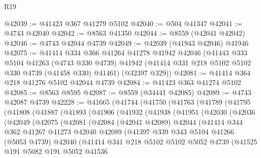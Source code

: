 \begin{lexlean}{R19}
\begin{coremodule}
{{{{{{{{{{{@42039 := @41423 @367 @41279 @5102
@42040 := @504 @41347
@42041 := @4743 @42040
@42042 := @8563 @41350
@42044 := @8559 (@42041 @42042)
@42046 := @4743 @42044 @4739
@42049 := @42039 (@41943 @42046) @41946
@42075 := @41414
    @334
    @366
    @41264
    @41278
    @41942
    @42046
    (@41443
      @333
      @5104
      @41263
      (@4743 @330 @4739)
      @41942
      (@41414 @331 @218 @5102 @5102 @330 @4739 (@41458 @330) @41461)
      (@32397 @329))
@42081 := @41414 @364 @218 @41276 @5102 @42044 @4739
@42084 := @41423 @363 @41274 @5102
@42085 := @8563 @8595
@42087 := @8559 (@34441 @42085)
@42089 := @4743 @42087 @4739
@42228 := @41665
    (@41744
      (@41750
        (@41763
          (@41789
            (@41795
              (@41808
                (@41887
                  (@41893
                    (@41906
                      (@41932
                        (@41938
                          (@41951
                            (@42030
                              (@42036
                                (@42049
                                  (@42075
                                    (@42081
                                      (@42084
                                        (@42041 @42089)
                                        @42044
                                        (@41414
                                          @344
                                          @362
                                          @41267
                                          @41273
                                          @42040
                                          @42089
                                          (@41397
                                            @339
                                            @343
                                            @5104
                                            @41266
                                            (@5053 @4739)
                                            @42040
                                            (@41414
                                              @341
                                              @218
                                              @5102
                                              @5102
                                              @5052
                                              @4739
                                              (@41525
                                                @191
                                                @5082
                                                @191
                                                @5052
                                                @41536
}}}}}}}}}}}
\end{coremodule}
\end{lexlean}
